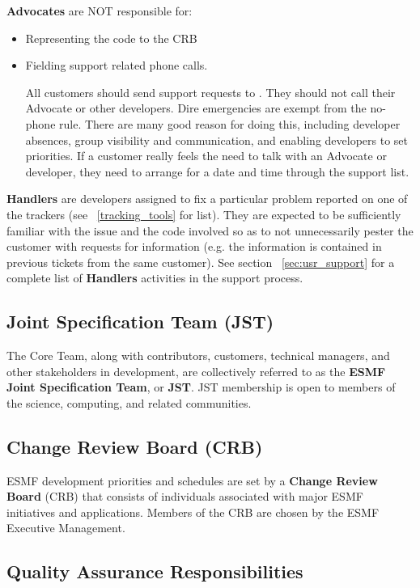 {\bf Advocates} are NOT responsible for:
\begin{itemize}
\item Representing the code to the CRB
\item Fielding support related phone calls.

All customers should send support requests to .
They should not call their Advocate or other developers.  Dire emergencies are exempt from the no-phone rule. 
There are many good reason for doing this, including developer absences, group visibility and communication,
and enabling developers to set priorities.  If a customer really feels the need to talk with an
Advocate or developer, they need to arrange for a date and time through the support list.
\end {itemize}

{\bf Handlers} are developers assigned to fix a particular problem reported on one of the trackers (see 
~\ref{tracking_tools} for list). They are expected to be sufficiently familiar with the issue and the
code involved so as to not unnecessarily pester the customer with requests for information (e.g. the
information is contained in previous tickets from the same customer). See section ~\ref{sec:usr_support} for
a complete list of {\bf Handlers} activities in the support process.  

\subsection{Joint Specification Team (JST)}
The Core Team, along with contributors, customers, technical
managers, and other stakeholders in development, are collectively
referred to as the {\bf ESMF Joint Specification Team}, or {\bf JST}.  
JST membership is open to members of the science, computing, and
related communities.


\subsection{Change Review Board (CRB)}
\label{crb}
ESMF development priorities and schedules are set by a 
{\bf Change Review Board} (CRB) that consists of individuals
associated with major ESMF initiatives and applications.  
Members of the CRB are chosen by the ESMF Executive Management.

\subsection{Quality Assurance Responsibilities}

